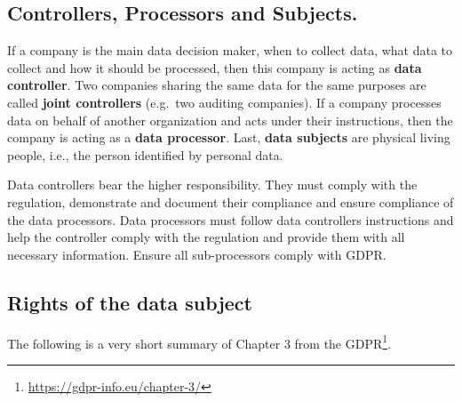\documentclass[
  12pt,
]{book}
\DeclareRobustCommand{\href}[2]{#2\footnote{\url{#1}}}
\begin{document}
\subsection{Controllers, Processors and Subjects.}\label{controllers-processors-and-subjects.}

If a company is the main data decision maker, when to collect data, what data to collect and how it should be processed, then this company is acting as \textbf{data controller}. Two companies sharing the same data for the same purposes are called \textbf{joint controllers} (e.g.~two auditing companies). If a company processes data on behalf of another organization and acts under their instructions, then the company is acting as a \textbf{data processor}. Last, \textbf{data subjects} are physical living people, i.e., the person identified by personal data.

Data controllers bear the higher responsibility. They must comply with the regulation, demonstrate and document their compliance and ensure compliance of the data processors. Data processors must follow data controllers instructions and help the controller comply with the regulation and provide them with all necessary information. Ensure all sub-processors comply with GDPR.

\subsection{Rights of the data subject}\label{rights-of-the-data-subject}

The following is a very short summary of \href{https://gdpr-info.eu/chapter-3/}{Chapter 3 from the GDPR}.
\end{document}
